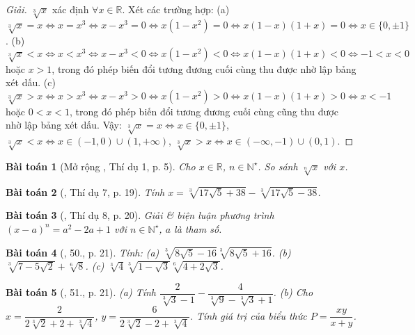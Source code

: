 \documentclass{article}
\newtheorem{baitoan}{Bài toán}
\begin{document}
\begin{proof}[Giải]
	$\sqrt[3]{x}$ xác định $\forall x\in\mathbb{R}$. Xét các trường hợp: (a) $\sqrt[3]{x} = x\Leftrightarrow x = x^3\Leftrightarrow x - x^3 = 0\Leftrightarrow x(1 - x^2) = 0\Leftrightarrow x(1 - x)(1 + x) = 0\Leftrightarrow x\in\{0,\pm1\}$. (b) $\sqrt[3]{x} < x\Leftrightarrow x < x^3\Leftrightarrow x - x^3 < 0\Leftrightarrow x(1 - x^2) < 0\Leftrightarrow x(1 - x)(1 + x) < 0\Leftrightarrow -1 < x < 0$ hoặc $x > 1$, trong đó phép biến đổi tương đương cuối cùng thu được nhờ lập bảng xét dấu. (c) $\sqrt[3]{x} > x\Leftrightarrow x > x^3\Leftrightarrow x - x^3 > 0\Leftrightarrow x(1 - x^2) > 0\Leftrightarrow x(1 - x)(1 + x) > 0\Leftrightarrow x < -1$ hoặc $0 < x < 1$, trong đó phép biến đổi tương đương cuối cùng cũng thu được nhờ lập bảng xét dấu. Vậy: $\sqrt[3]{x} = x\Leftrightarrow x\in\{0,\pm1\}$, $\sqrt[3]{x} < x\Leftrightarrow x\in(-1,0)\cup(1,+\infty)$, $\sqrt[3]{x} > x\Leftrightarrow x\in(-\infty,-1)\cup(0,1)$.
\end{proof}

\begin{baitoan}[Mở rộng \cite{Tuyen_Toan_9}, Thí dụ 1, p. 5]
	Cho $x\in\mathbb{R}$, $n\in\mathbb{N}^\star$. So sánh $\sqrt[n]{x}$ với $x$.
\end{baitoan}

\begin{baitoan}[\cite{Tuyen_Toan_9}, Thí dụ 7, p. 19]
	Tính $x = \sqrt[3]{17\sqrt{5} + 38} - \sqrt[3]{17\sqrt{5} - 38}$.
\end{baitoan}

\begin{baitoan}[\cite{Tuyen_Toan_9}, Thí dụ 8, p. 20]
	Giải \& biện luận phương trình $(x - a)^n = a^2 - 2a + 1$ với $n\in\mathbb{N}^\star$, $a$ là tham số.
\end{baitoan}

\begin{baitoan}[\cite{Tuyen_Toan_9}, 50., p. 21]
	Tính: (a) $\sqrt[3]{8\sqrt{5} - 16}\sqrt[3]{8\sqrt{5} + 16}$. (b) $\sqrt[3]{7 - 5\sqrt{2}} + \sqrt[6]{8}$. (c) $\sqrt[3]{4}\sqrt[3]{1 - \sqrt{3}}\sqrt[6]{4 + 2\sqrt{3}}$.
\end{baitoan}

\begin{baitoan}[\cite{Tuyen_Toan_9}, 51., p. 21]
	(a) Tính $\dfrac{2}{\sqrt[3]{3} - 1} - \dfrac{4}{\sqrt[3]{9} - \sqrt[3]{3} + 1}$. (b) Cho $x = \dfrac{2}{2\sqrt[3]{2} + 2 + \sqrt[3]{4}}$, $y = \dfrac{6}{2\sqrt[3]{2} - 2 + \sqrt[3]{4}}$. Tính giá trị của biểu thức $P = \dfrac{xy}{x + y}$.
\end{baitoan}
\end{document}

